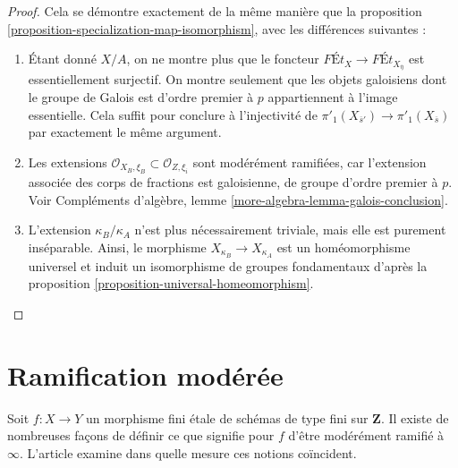 \begin{proof}
Cela se démontre exactement de la même manière que la
proposition \ref{proposition-specialization-map-isomorphism},
avec les différences suivantes :
\begin{enumerate}
\item Étant donné $X/A$, on ne montre plus que le foncteur
$\textit{F\'Et}_X \to \textit{F\'Et}_{X_{\overline{\eta}}}$
est essentiellement surjectif. On montre seulement que les objets galoisiens
dont le groupe de Galois est d'ordre premier à $p$ appartiennent à l'image
essentielle. Cela suffit pour conclure à l'injectivité de
$\pi'_1(X_{\overline{s}'}) \to \pi'_1(X_{\overline{s}})$ par
exactement le même argument.
\item Les extensions
$\mathcal{O}_{X_B, \xi_B} \subset \mathcal{O}_{Z, \xi_i}$
sont modérément ramifiées, car l'extension associée des corps de
fractions est galoisienne, de groupe d'ordre premier à $p$. Voir
Compléments d'algèbre, lemme \ref{more-algebra-lemma-galois-conclusion}.
\item L'extension $\kappa_B/\kappa_A$ n'est plus
nécessairement triviale, mais elle est purement inséparable.
Ainsi, le morphisme $X_{\kappa_B} \to X_{\kappa_A}$
est un homéomorphisme universel et induit un isomorphisme
de groupes fondamentaux d'après la proposition \ref{proposition-universal-homeomorphism}.
\end{enumerate}
\end{proof}













\section{Ramification modérée}
\label{section-tame}

\noindent
Soit $f : X \to Y$ un morphisme fini \'etale de schémas de type fini
sur $\mathbf{Z}$. Il existe de nombreuses façons de définir ce que signifie pour $f$
d'être modérément ramifié à $\infty$. L'article \cite{Kerz-Schmidt}
examine dans quelle mesure ces notions coïncident.


